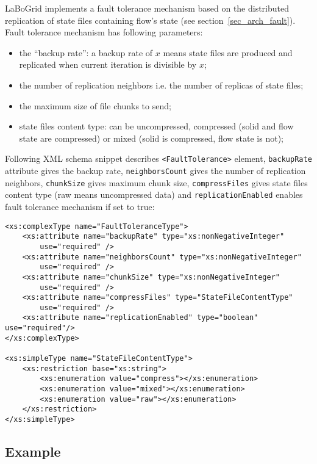 LaBoGrid implements a fault tolerance mechanism based on the distributed
replication of state files containing flow's state (see
section~\ref{sec_arch_fault}). Fault tolerance mechanism has following
parameters:

\begin{itemize}
	\item the ``backup rate'': a backup rate of $x$ means state files are
	produced and replicated when current iteration is divisible by $x$;
	\item the number of replication neighbors i.e. the number of replicas
	of state files;
	\item the maximum size of file chunks to send;
	\item state files content type: can be uncompressed, compressed (solid and
	flow state are compressed) or mixed (solid is compressed, flow state is not);
\end{itemize}

Following XML schema snippet describes \verb|<FaultTolerance>| element,
\texttt{backup\-Rate} attribute gives the backup rate, \texttt{neighborsCount}
gives the number of replication neighbors, \texttt{chunkSize} gives maximum
chunk size, \texttt{compressFiles} gives state files content type (raw means
uncompressed data) and \texttt{replicationEnabled} enables fault tolerance
mechanism if set to true:

\begin{Verbatim}[tabsize=2,frame=lines]
<xs:complexType name="FaultToleranceType">
	<xs:attribute name="backupRate" type="xs:nonNegativeInteger"
		use="required" />
	<xs:attribute name="neighborsCount" type="xs:nonNegativeInteger"
		use="required" />
	<xs:attribute name="chunkSize" type="xs:nonNegativeInteger"
		use="required" />
	<xs:attribute name="compressFiles" type="StateFileContentType"
		use="required" />
	<xs:attribute name="replicationEnabled" type="boolean" use="required"/>
</xs:complexType>

<xs:simpleType name="StateFileContentType">
	<xs:restriction base="xs:string">
		<xs:enumeration value="compress"></xs:enumeration>
		<xs:enumeration value="mixed"></xs:enumeration>
		<xs:enumeration value="raw"></xs:enumeration>
	</xs:restriction>
</xs:simpleType>
\end{Verbatim}


\subsection{Example}

